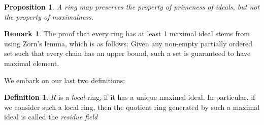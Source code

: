 \documentclass[12pt]{book}
\newtheorem{proposition}{Proposition}[section]
\theoremstyle{definition}
\newtheorem*{definition}{Definition}
\newtheorem*{remark}{Remark}
\begin{document}
\begin{proposition}
    A ring map preserves the property of primeness of ideals, but not the property of maximalness.
\end{proposition}
\begin{remark}
    The proof that every ring has at least 1 maximal ideal stems from using Zorn's lemma, which is as follows: Given any non-empty partially ordered set such that every chain has an upper bound, such a set is guaranteed to have maximal element.
\end{remark}
We embark on our last two definitions:
\begin{definition}
    $R$ is a \textit{local} ring, if it has a unique maximal ideal. In particular, if we consider such a local ring, then the quotient ring generated by such a maximal ideal is called the \textit{residue field}
\end{definition}
\end{document}
